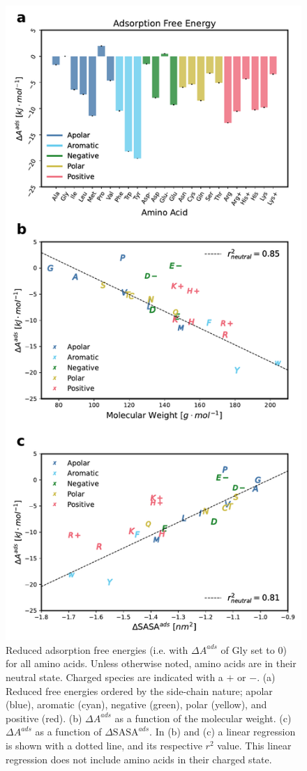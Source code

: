 \documentclass[journal=jcisd8,manuscript=article,layout=twocolumn]{achemso}
\begin{document}
\begin{figure}[htbp]
\centerline{\includegraphics[width=.95\columnwidth]{Fig3.pdf}}
\caption[]{\label{fig:AadsCorre} Reduced adsorption free energies (i.e. with $\Delta A^{ads}$ of Gly set to $0$) for all amino acids. Unless otherwise noted, amino acids are in their neutral state. Charged species are indicated with a $+$ or $-$. (a) Reduced free energies ordered by the side-chain nature;  apolar (blue), aromatic (cyan), negative (green), polar (yellow), and positive (red). (b) $\Delta A^{ads}$ as a function of the molecular weight. (c) $\Delta A^{ads}$ as a function of $\Delta \textrm{SASA}^{ads}$. In (b) and (c) a linear regression is shown with a dotted line, and its respective $r^2$ value. This linear regression does not include amino acids in their charged state.}
\end{figure}
\end{document}
